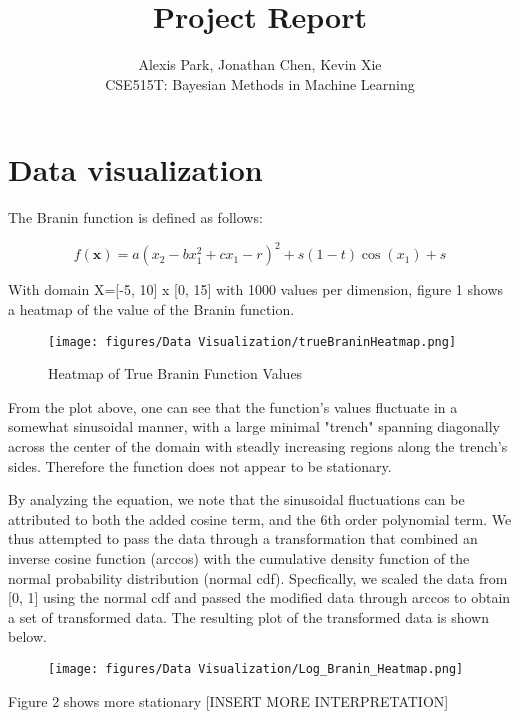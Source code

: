 \documentclass[11pt]{article}
\newcommand{\Course}{CSE515T: Bayesian Methods in Machine Learning}
\numberwithin{equation}{section}
\begin{document}
\title{Project Report}
\author{Alexis Park, Jonathan Chen, Kevin Xie \\ \Course}
\maketitle

\section*{Data visualization}

The Branin function is defined as follows:

\begin{equation}
  f(\bm{x}) = a(x_2 - bx_1^2 + cx_1 - r)^2 + s(1 - t)\cos(x_1) + s
  \label{eq:branin}
\end{equation}

With domain X=[-5, 10] x [0, 15]  with 1000 values per dimension, figure 1 shows a heatmap of the value of the Branin function.
\begin{figure}[H]
  \centering
  \texttt{[image: figures/Data Visualization/trueBraninHeatmap.png]}
  \caption{Heatmap of True Branin Function Values}
  \label{}
\end{figure}

From the plot above, one can see that the function's values fluctuate in a somewhat sinusoidal manner, with a large minimal "trench" spanning diagonally across the center of the domain with steadly increasing regions along the trench's sides. Therefore the function does not appear to be stationary.

By analyzing the equation, we note that the sinusoidal fluctuations can be attributed to both the added cosine term, and the 6th order polynomial term. We thus attempted to pass the data through a transformation that combined an inverse cosine function (arccos) with the cumulative density function of the normal probability distribution (normal cdf). Specfically, we scaled the data from [0, 1] using the normal cdf and passed the modified data through arccos to obtain a set of transformed data. The resulting plot of the transformed data is shown below.

\begin{figure}[H]
  \centering
  \texttt{[image: figures/Data Visualization/Log\_Branin\_Heatmap.png]}
  \caption{}
  \label{}
\end{figure}
Figure 2 shows more stationary [INSERT MORE INTERPRETATION]
\end{document}
